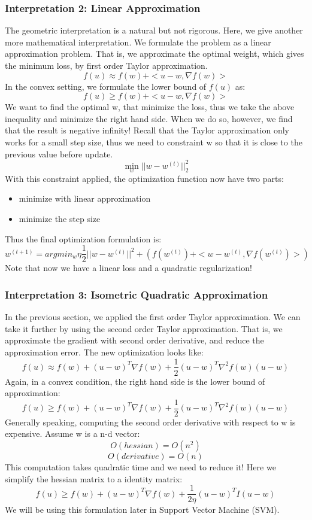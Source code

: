 \documentclass[11pt]{article}
\begin{document}
\subsubsection*{Interpretation 2: Linear Approximation}
The geometric interpretation is a natural but not rigorous. Here, we give another more mathematical interpretation. We formulate the problem as a linear approximation problem. That is, we approximate the optimal weight, which gives the minimum loss, by first order Taylor approximation. 
\[f(u) \approx f(w) + <u-w, \nabla f(w)>\]
In the convex setting, we formulate the lower bound of \(f(u)\) as:
\[f(u) \geq f(w) + <u-w, \nabla f(w)>\]
We want to find the optimal w, that minimize the loss, thus we take the above inequality and minimize the right hand side. When we do so, however, we find that the result is negative infinity! Recall that the Taylor approximation only works for a small step size, thus we need to constraint w so that it is close to the previous value before update.
\[\min_w ||w - w^{(t)}||^2_2\]
With this constraint applied, the optimization function now have two parts:
\begin{itemize}
    \item minimize with linear approximation
    \item minimize the step size
\end{itemize}
Thus the final optimization formulation is:
\[w^{(t+1)} = arg min_w \eta \frac{1}{2} ||w - w^{(t)}||^2 + (f(w^{(t)}) + <w - w^{(t)}, \nabla f(w^{(t)})>)\]
Note that now we have a linear loss and a quadratic regularization!

\subsubsection*{Interpretation 3: Isometric Quadratic Approximation}
In the previous section, we applied the first order Taylor approximation. We can take it further by using the second order Taylor approximation. That is, we approximate the gradient with second order derivative, and reduce the approximation error. The new optimization looks like:
\[f(u) \approx f(w) + (u-w)^T\nabla f(w) + \frac{1}{2} (u-w)^T \nabla^2 f(w)(u-w)\]
Again, in a convex condition, the right hand side is the lower bound of approximation:
\[f(u) \geq f(w) + (u-w)^T\nabla f(w) + \frac{1}{2} (u-w)^T \nabla^2 f(w)(u-w)\]
Generally speaking, computing the second order derivative with respect to w is expensive. Assume w is a n-d vector:
\[O(hessian) = O(n^2)\]
\[O(derivative) = O(n)\]
This computation takes quadratic time and we need to reduce it! Here we simplify the hessian matrix to a identity matrix:
\[f(u) \geq f(w) + (u-w)^T\nabla f(w) + \frac{1}{2\eta} (u-w)^T I(u-w)\]
We will be using this formulation later in Support Vector Machine (SVM).
\end{document}
